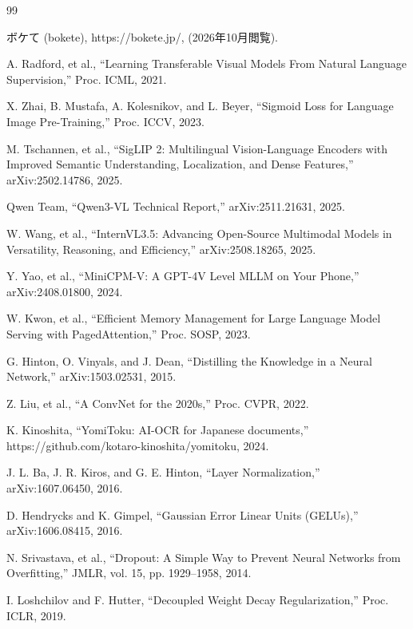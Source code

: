\begin{thebibliography}{99}

    ボケて (bokete), https://bokete.jp/, (2026年10月閲覧).

    A. Radford, et al., ``Learning Transferable Visual Models From Natural Language Supervision,'' Proc. ICML, 2021.

    X. Zhai, B. Mustafa, A. Kolesnikov, and L. Beyer, ``Sigmoid Loss for Language Image Pre-Training,'' Proc. ICCV, 2023.

    M. Tschannen, et al., ``SigLIP 2: Multilingual Vision-Language Encoders with Improved Semantic Understanding, Localization, and Dense Features,'' arXiv:2502.14786, 2025.

    Qwen Team, ``Qwen3-VL Technical Report,'' arXiv:2511.21631, 2025.

    W. Wang, et al., ``InternVL3.5: Advancing Open-Source Multimodal Models in Versatility, Reasoning, and Efficiency,'' arXiv:2508.18265, 2025.

    Y. Yao, et al., ``MiniCPM-V: A GPT-4V Level MLLM on Your Phone,'' arXiv:2408.01800, 2024.

    W. Kwon, et al., ``Efficient Memory Management for Large Language Model Serving with PagedAttention,'' Proc. SOSP, 2023.

    G. Hinton, O. Vinyals, and J. Dean, ``Distilling the Knowledge in a Neural Network,'' arXiv:1503.02531, 2015.

    Z. Liu, et al., ``A ConvNet for the 2020s,'' Proc. CVPR, 2022.

    K. Kinoshita, ``YomiToku: AI-OCR for Japanese documents,'' https://github.com/kotaro-kinoshita/yomitoku, 2024.

    J. L. Ba, J. R. Kiros, and G. E. Hinton, ``Layer Normalization,'' arXiv:1607.06450, 2016.

    D. Hendrycks and K. Gimpel, ``Gaussian Error Linear Units (GELUs),'' arXiv:1606.08415, 2016.

    N. Srivastava, et al., ``Dropout: A Simple Way to Prevent Neural Networks from Overfitting,'' JMLR, vol. 15, pp. 1929--1958, 2014.

    I. Loshchilov and F. Hutter, ``Decoupled Weight Decay Regularization,'' Proc. ICLR, 2019.

\end{thebibliography}
